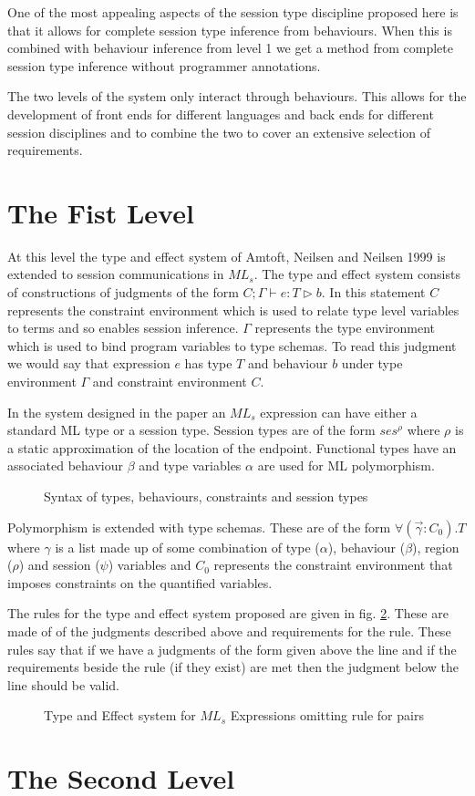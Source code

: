 One of the most appealing aspects of the session type discipline proposed here is that it allows for complete session type inference from behaviours. When this is combined with behaviour inference from level 1 we get a method from complete session type inference without programmer annotations. 

The two levels of the system only interact through behaviours. This allows for the development of front ends for different languages and back ends for different session disciplines and to combine the two to cover an extensive selection of requirements. 

\section{The Fist Level} \label{level1}

At this level the type and effect system of Amtoft, Neilsen and Neilsen 1999 \cite{amtoft} is extended to session communications in $ML_s$. The type and effect system consists of constructions of judgments of the form $C;\Gamma \vdash e : T \triangleright b$. In this statement $C$ represents the constraint environment which is used to relate type level variables to terms and so enables session inference. $\Gamma$ represents the type environment which is used to bind program variables to type schemas. To read this judgment we would say that expression $e$ has type $T$ and behaviour $b$ under type environment $\Gamma$ and constraint environment $C$.

In the system designed in the paper an $ML_s$ expression can have either a standard ML type or a session type. Session types are of the form $ses^\rho$ where $\rho$ is a static approximation of the location of the endpoint. Functional types have an associated behaviour $\beta$ and type variables $\alpha$ are used for ML polymorphism. 

\begin{figure}
\caption{Syntax of types, behaviours, constraints and session types}
\label{syntaxTypes}
\end{figure}

Polymorphism is extended with type schemas. These are of the form $\forall(\overrightarrow{\gamma}:C_0).T$ where $\gamma$ is a list made up of some combination of type ($\alpha$), behaviour ($\beta$), region ($\rho$) and session ($\psi$) variables and $C_0$ represents the constraint environment that imposes constraints on the quantified variables. 

The rules for the type and effect system proposed are given in fig. \ref{typeAndEffect}. These are made of of the judgments described above and requirements for the rule. These rules say that if we have a judgments of the form given above the line and if the requirements beside the rule (if they exist) are met then the judgment below the line should be valid. 

\begin{figure}
\caption{Type and Effect system for $ML_s$ Expressions omitting rule for pairs}
\label{typeAndEffect}
\end{figure}



\section{The Second Level} \label{level2}